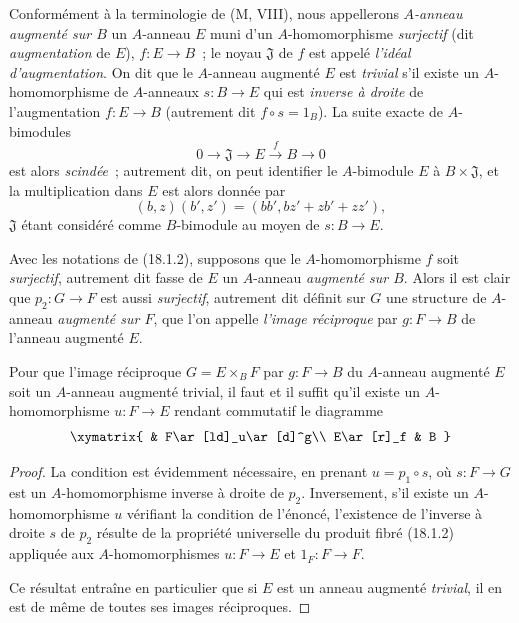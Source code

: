 \begin{env}[18.1.4]
\label{0.18.1.4-fr}
Conformément à la terminologie de (M, VIII), nous appellerons
\emph{$A$-anneau augmenté sur $B$} un $A$-anneau $E$ muni d'un
$A$-homomorphisme \emph{surjectif} (dit \emph{augmentation} de $E$),
$f:E\to B$~; le noyau $\mathfrak{J}$ de $f$ est appelé
\emph{l'idéal d'augmentation}. On dit que le $A$-anneau augmenté $E$ est
\emph{trivial} s'il existe un $A$-homomorphisme de $A$-anneaux $s:B\to E$
qui est \emph{inverse à droite} de l'augmentation $f:E\to B$ (autrement dit
$f\circ s=1_B$). La suite exacte de $A$-bimodules
\[
  0\longrightarrow\mathfrak{J}\longrightarrow E
  \xrightarrow{f}B\longrightarrow0
\]
est alors \emph{scindée}~; autrement dit, on peut identifier le $A$-bimodule
$E$ à $B\times\mathfrak{J}$, et la multiplication dans $E$ est alors donnée
par
\[
  (b,z)(b',z')=(bb',bz'+zb'+zz'),
\]
$\mathfrak{J}$ étant considéré comme $B$-bimodule au moyen de $s:B\to E$.
\end{env}

\begin{env}[18.1.5]
\label{0.18.1.5-fr}
Avec les notations de (18.1.2), supposons que le $A$-homomorphisme $f$ soit
\emph{surjectif}, autrement dit fasse de $E$ un $A$-anneau \emph{augmenté sur
$B$}. Alors il est clair que $p_2:G\to F$ est aussi \emph{surjectif},
autrement dit définit sur $G$ une structure de $A$-anneau \emph{augmenté sur
$F$}, que l'on appelle \emph{l'image réciproque} par $g:F\to B$ de l'anneau
augmenté $E$.
\end{env}

\begin{proposition}[18.1.6]
\label{0.18.1.6-fr}
Pour que l'image réciproque $G=E\times_BF$ par $g:F\to B$ du $A$-anneau
augmenté $E$ soit un $A$-anneau augmenté trivial, il faut et il suffit qu'il
existe un $A$-homomorphisme $u:F\to E$ rendant commutatif le diagramme
\[
  \xymatrix{
    & F\ar[ld]_u\ar[d]^g\\
    E\ar[r]_f & B
  }
\]
\end{proposition}

\begin{proof}
La condition est évidemment nécessaire, en prenant $u=p_1\circ s$, où
$s:F\to G$ est un $A$-homomorphisme inverse à droite de $p_2$. Inversement,
s'il existe un $A$-homomorphisme $u$ vérifiant la condition de l'énoncé,
l'existence de l'inverse à droite $s$ de $p_2$ résulte de la propriété
universelle du produit fibré (18.1.2) appliquée aux $A$-homomorphismes
$u:F\to E$ et $1_F:F\to F$.

Ce résultat entraîne en particulier que si $E$ est un anneau augmenté
\emph{trivial}, il en est de même de toutes ses images réciproques.
\end{proof}

